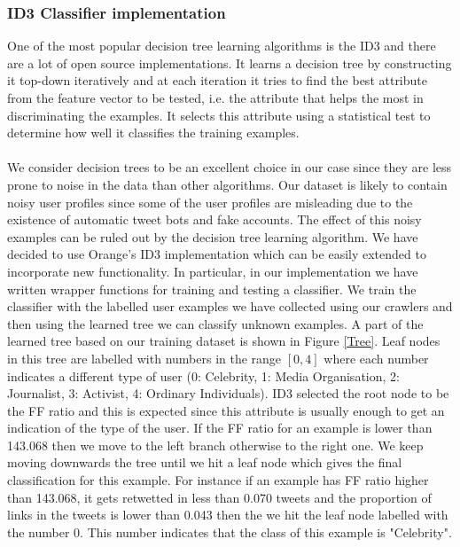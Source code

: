 \subsubsection{ID3 Classifier implementation}
One of the most popular decision tree learning algorithms is the ID3 and there are a lot of open source implementations. It learns a decision tree by constructing it top-down iteratively and 
at each iteration it tries to find the best attribute from the feature vector to be tested, i.e. the attribute that helps the most in discriminating the examples. It selects this attribute using
a statistical test to determine how well it classifies the training examples.\\\\
We consider decision trees to be an excellent choice in our case since they are less prone to noise in the data than other algorithms. Our dataset is likely to contain noisy user profiles since some of the user profiles are misleading due to the existence of automatic tweet bots and fake accounts. The effect of this noisy examples can be ruled out by the decision tree learning algorithm.  
We have decided to use Orange's ID3 implementation which can be easily extended to incorporate new functionality. In particular, in our implementation we have written wrapper functions for training and testing a classifier. We train the classifier with the labelled user examples we have collected using our crawlers and then using the learned tree we can classify unknown examples. A part of the learned tree based on our training dataset is shown in Figure \ref{Tree}. Leaf nodes in this tree are labelled with numbers in the range $[0, 4]$ where each number indicates a different type of user (0: Celebrity, 1: Media Organisation, 2: Journalist, 3: Activist, 4: Ordinary Individuals). ID3 selected the root node to be the FF ratio and this is expected since this attribute is usually enough to get an indication of the type of the user. If the FF ratio for an example is lower than 143.068 then we move to the left branch otherwise to the right one. We keep moving downwards the tree until we hit a leaf node which gives the final classification for this example. For instance if an example has FF ratio higher than 143.068, it gets retwetted in less than 0.070 tweets and the proportion of links in the tweets is lower than 0.043 then the we hit the leaf node labelled with the number $0$. This number indicates that the class of this example is "Celebrity".

